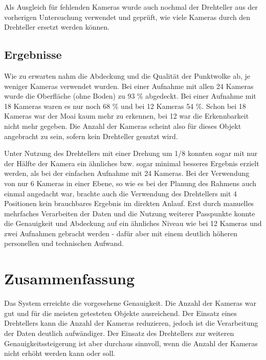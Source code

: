 \documentclass[./00PhotoBox.tex]{subfiles}
\begin{document}
Als Ausgleich für fehlenden Kameras wurde auch nochmal der Drehteller aus der vorherigen Untersuchung verwendet und geprüft, wie viele Kameras durch den Drehteller ersetzt werden können.

\subsection{Ergebnisse}
Wie zu erwarten nahm die Abdeckung und die Qualität der Punktwolke ab, je weniger Kameras verwendet wurden. Bei einer Aufnahme mit allen 24 Kameras wurde die Oberfläche (ohne Boden) zu 93 \% abgedeckt. Bei einer Aufnahme mit 18 Kameras waren es nur noch 68 \% und bei 12 Kameras 54 \%.  Schon bei 18 Kameras war der Moai kaum mehr zu erkennen, bei 12 war die Erkennbarkeit nicht mehr gegeben. Die Anzahl der Kameras scheint also für dieses Objekt angebracht zu sein, sofern kein Drehteller genutzt wird.

Unter Nutzung des Drehtellers mit einer Drehung um 1/8 konnten sogar mit nur der Hälfte der Kamera ein ähnliches bzw. sogar minimal besseres Ergebnis erzielt werden, als bei der einfachen Aufnahme mit 24 Kameras. Bei der Verwendung von nur 6 Kameras in einer Ebene, so wie es bei der Planung des Rahmens auch einmal angedacht war, brachte auch die Verwendung des Drehtellers mit 4 Positionen kein brauchbares Ergebnis im direkten Anlauf. Erst durch manuelles mehrfaches Verarbeiten der Daten und die Nutzung weiterer Passpunkte konnte die Genauigkeit und Abdeckung auf ein ähnliches Niveau wie bei 12 Kameras und zwei Aufnahmen gebracht werden - dafür aber mit einem deutlich höheren personellen und technischen Aufwand.

\section{Zusammenfassung}
Das System erreichte die vorgesehene Genauigkeit. Die Anzahl der Kameras war gut und für die meisten getesteten Objekte ausreichend. Der Einsatz eines Drehtellers kann die Anzahl der Kameras reduzieren, jedoch ist die Verarbeitung der Daten deutlich aufwändiger. Der Einsatz des Drehtellers zur weiteren Genauigkeitssteigerung ist aber durchaus sinnvoll, wenn die Anzahl der Kameras nicht erhöht werden kann oder soll.

\biblio
\end{document}
